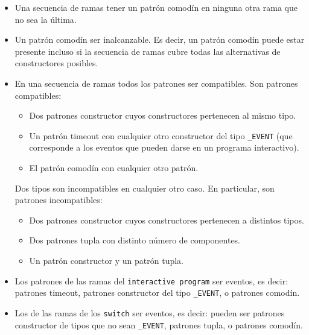 \documentclass{article}
\begin{document}
\begin{itemize}
\item Una secuencia de ramas \NOPUEDE tener un patr\'on comod\'in en ninguna otra rama que no sea la \'ultima.
\item Un patr\'on comod\'in \PUEDE ser inalcanzable.
      Es decir, un patr\'on comod\'in puede estar presente incluso si la secuencia de ramas
      cubre todas las alternativas de constructores posibles.
\item En una secuencia de ramas todos los patrones \DEBEN ser compatibles.
      Son patrones compatibles:
      \begin{itemize}
      \item Dos patrones constructor cuyos constructores pertenecen al mismo tipo.
      \item Un patr\'on timeout con cualquier otro constructor del tipo \texttt{\_EVENT}
            (que corresponde a los eventos que pueden darse en un programa interactivo).
      \item El patr\'on comod\'in con cualquier otro patr\'on.
      \end{itemize}
      Dos tipos son incompatibles en cualquier otro caso. En particular, son patrones incompatibles:
      \begin{itemize}
      \item Dos patrones constructor cuyos constructores pertenecen a distintos tipos.
      \item Dos patrones tupla con distinto n\'umero de componentes.
      \item Un patr\'on constructor y un patr\'on tupla.
      \end{itemize}
\item Los patrones de las ramas del \texttt{interactive program}
      \DEBEN ser eventos, es decir:
      patrones timeout,
      patrones constructor del tipo \texttt{\_EVENT},
      o patrones comod\'in.
\item Los de las ramas de los \texttt{switch} \NOPUEDEN ser eventos, es decir:
      pueden ser patrones constructor de tipos que no sean \texttt{\_EVENT},
      patrones tupla,
      o patrones comod\'in.
\end{itemize}
\end{document}
